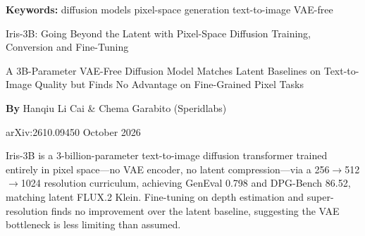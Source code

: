 \documentclass[10pt,twocolumn]{article}
\begin{document}
\setlength{\parindent}{0pt}
\setlength{\parskip}{4pt}

{\small\color{keywordgray}\textbf{Keywords:}
  diffusion models \textbullet{}
  pixel-space generation \textbullet{}
  text-to-image \textbullet{}
  VAE-free}\par\vspace{4pt}

{\LARGE\bfseries\raggedright
  Iris-3B: Going Beyond the Latent with Pixel-Space Diffusion
  Training, Conversion and Fine-Tuning}\par\vspace{4pt}

{\large\itshape\raggedright
  A 3B-Parameter VAE-Free Diffusion Model Matches Latent Baselines on
  Text-to-Image Quality but Finds No Advantage on Fine-Grained Pixel Tasks}\par\vspace{6pt}

{\small\textbf{By} Hanqiu Li Cai \& Chema Garabito (Speridlabs)}\par\vspace{2pt}

{\small\color{keywordgray}arXiv:2610.09450 \textbullet{} October 2026}
\par\vspace{2pt}\noindent{\color{rulered}\rule{\columnwidth}{0.6pt}}\vspace{6pt}

Iris-3B is a 3-billion-parameter text-to-image diffusion transformer trained
entirely in pixel space---no VAE encoder, no latent compression---via a
256$\to$512$\to$1024 resolution curriculum, achieving GenEval 0.798 and
DPG-Bench 86.52, matching latent FLUX.2 Klein. Fine-tuning on depth
estimation and super-resolution finds no improvement over the latent baseline,
suggesting the VAE bottleneck is less limiting than assumed.
\end{document}
